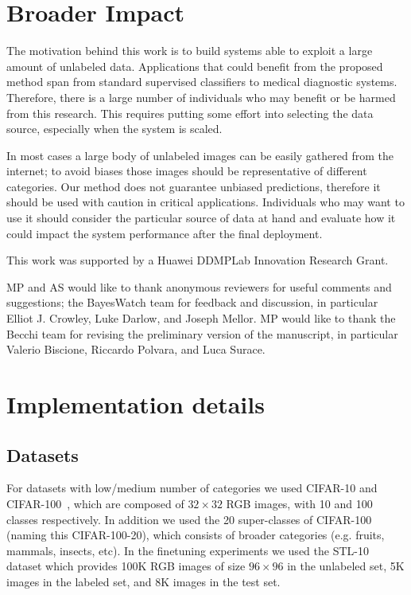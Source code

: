 \documentclass{article}
\begin{document}
\section*{Broader Impact}

The motivation behind this work is to build systems able to exploit a large amount of unlabeled data. Applications that could benefit from the proposed method span from standard supervised classifiers to medical diagnostic systems. Therefore, there is a large number of individuals who may benefit or be harmed from this research. This requires putting some effort into selecting the data source, especially when the system is scaled. 

In most cases a large body of unlabeled images can be easily gathered from the internet; to avoid biases those images should be representative of different categories. Our method does not guarantee unbiased predictions, therefore it should be used with caution in critical applications. Individuals who may want to use it should consider the particular source of data at hand and evaluate how it could impact the system performance after the final deployment.

\begin{ack}
This work was supported by a Huawei DDMPLab Innovation Research Grant.

MP and AS would like to thank anonymous reviewers for useful comments and suggestions; the BayesWatch team for feedback and discussion, in particular Elliot J. Crowley, Luke Darlow, and Joseph Mellor. MP would like to thank the Becchi team for revising the preliminary version of the manuscript, in particular Valerio Biscione, Riccardo Polvara, and Luca Surace.

\end{ack}

\small


\FloatBarrier
\clearpage
\appendix 

\section{Implementation details}\label{appendix:implementation_details}
\FloatBarrier

\subsection{Datasets}

For datasets with low/medium number of categories we used CIFAR-10 and CIFAR-100~\citep{krizhevsky2009learning}, which are composed of $32 \times 32$ RGB images, with 10 and 100 classes respectively. In addition we used the 20 super-classes of CIFAR-100 (naming this CIFAR-100-20), which consists of broader categories (e.g. fruits, mammals, insects, etc). In the finetuning experiments we used the STL-10 dataset \citep{coates2011analysis} which provides 100K RGB images of size $96 \times 96$ in the unlabeled set, 5K images in the labeled set, and 8K images in the test set.
\end{document}
